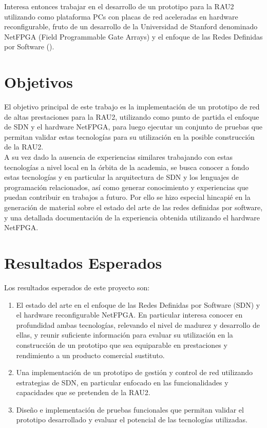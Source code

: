 Interesa entonces trabajar en el desarrollo de un prototipo para la RAU2 utilizando como plataforma PCs con placas de red aceleradas en hardware reconfigurable, fruto de un desarrollo de la Universidad de Stanford denominado NetFPGA (Field Programmable Gate Arrays)\citep{NetFPGA} y el enfoque de las Redes Definidas por Software ()\citep{gude2008nox}\citep{SDNReadingList}.

\section{Objetivos}
El objetivo principal de este trabajo es la implementación de un prototipo de red de altas prestaciones para la RAU2, utilizando como punto de partida el enfoque de SDN y el hardware NetFPGA, para luego ejecutar un conjunto de pruebas que permitan validar estas tecnologías para su utilización en  la posible construcción de la RAU2.\\

A su vez dado la ausencia de experiencias similares  trabajando con estas tecnologías a nivel local en la órbita de la academia, se busca conocer a fondo estas tecnologías y en particular la arquitectura de SDN y los lenguajes de programación relacionados, así como generar conocimiento y experiencias que puedan contribuir en trabajos a futuro. Por ello se hizo especial hincapié en la generación de  material sobre el estado del arte de las redes definidas por software, y una detallada documentación de la experiencia obtenida utilizando el hardware NetFPGA.

\section{Resultados Esperados}
Los resultados esperados de este proyecto son:

\begin{enumerate}
\item El estado del arte en el enfoque de las Redes Definidas por Software (SDN) y el hardware reconfigurable NetFPGA. En particular interesa conocer en profundidad ambas tecnologías, relevando el nivel de madurez y desarrollo de ellas, y reunir suficiente información para evaluar su utilización en la construcción de un prototipo que sea equiparable en prestaciones y rendimiento a un producto comercial sustituto.

\item Una implementaci\'on de un prototipo de gesti\'on y control de red utilizando estrategias de SDN, en particular enfocado en las funcionalidades y capacidades que se pretenden de la RAU2.

\item Diseño e implementación de pruebas funcionales que permitan validar el prototipo desarrollado y evaluar el potencial de las tecnologías utilizadas.

\end{enumerate}

